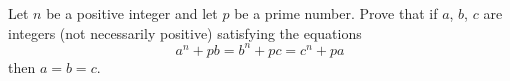 Let $n$ be a positive integer and let $p$ be a prime number. Prove that if $a$,  $b$,  $c$ are integers (not necessarily positive) satisfying the equations \[ a^n + pb = b^n + pc = c^n + pa\] then $a = b = c$.